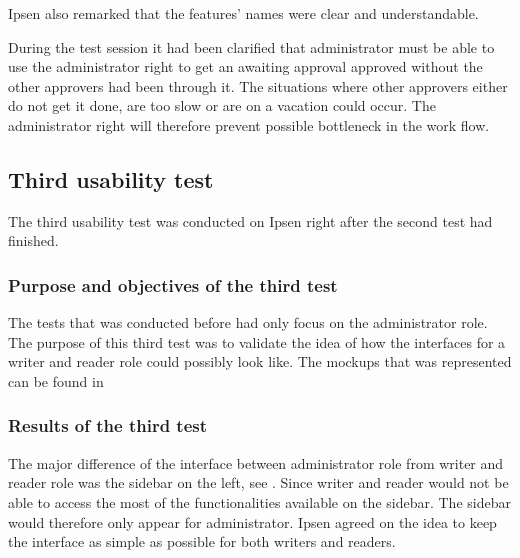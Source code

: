 Ipsen also remarked that the features' names were clear and understandable. 

During the test session it had been clarified that administrator must be able to use the administrator right to get an awaiting approval approved without the other approvers had been through it.
The situations where other approvers either do not get it done, are too slow or are on a vacation could occur. 
The administrator right will therefore prevent possible bottleneck in the work flow.



\subsection{Third usability test}\label{thirdtest}
The third usability test was conducted on Ipsen right after the second test had finished. 

\subsubsection*{Purpose and objectives of the third test}
The tests that was conducted before had only focus on the administrator role.
The purpose of this third test was to validate the idea of how the interfaces for a writer and reader role could possibly look like. 
The mockups that was represented can be found in  %

\subsubsection*{Results of the third test}
The major difference of the interface between administrator role from writer and reader role was the sidebar on the left, see .
Since writer and reader would not be able to access the most of the functionalities available on the sidebar.
The sidebar would therefore only appear for administrator. 
Ipsen agreed on the idea to keep the interface as simple as possible for both writers and readers. 

